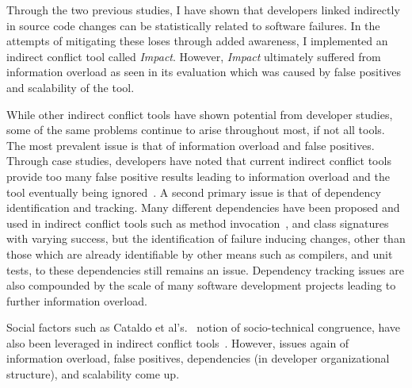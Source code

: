 \label{chapter:exploration}

Through the two previous studies, I have shown that developers linked indirectly in source code changes can be statistically
related to software failures. In the attempts of mitigating these loses through added awareness, I implemented
an indirect conflict tool called \textit{Impact}. However, \textit{Impact} ultimately suffered from information
overload as seen in its evaluation which was caused by false positives and scalability of the tool.

While other indirect conflict tools have shown potential from developer studies, some of the same problems continue
to arise throughout most, if not all tools. The most prevalent issue is that of information
overload and false positives. Through case studies, developers have noted that current indirect conflict tools provide too many 
false positive results leading to information overload and the tool eventually being
ignored~\cite{Sarma:2007:TSA, Servant:2010:CPI}. A second primary issue is that of dependency identification and
tracking. Many different dependencies have been proposed and used in indirect conflict tools such as method 
invocation~\cite{Trainer:2005:BGT}, and class signatures~\cite{Sarma:2007:TSA} with varying success, but the 
identification of failure inducing changes, other than those which are already identifiable by other means such
as compilers, and unit tests, to these dependencies still remains an issue. Dependency tracking issues are
also compounded by the scale of many software development projects leading to further information overload.

Social factors such as Cataldo et al's.~\cite{Cataldo:2006:ICR} notion of socio-technical
congruence, have also been leveraged in indirect conflict tools~\cite{Kwan:2011:ESC, Begel:2010:CDE, Borici:2012:CHA}.
However, issues again of information overload, false positives, dependencies (in developer organizational structure), and scalability 
come up.

